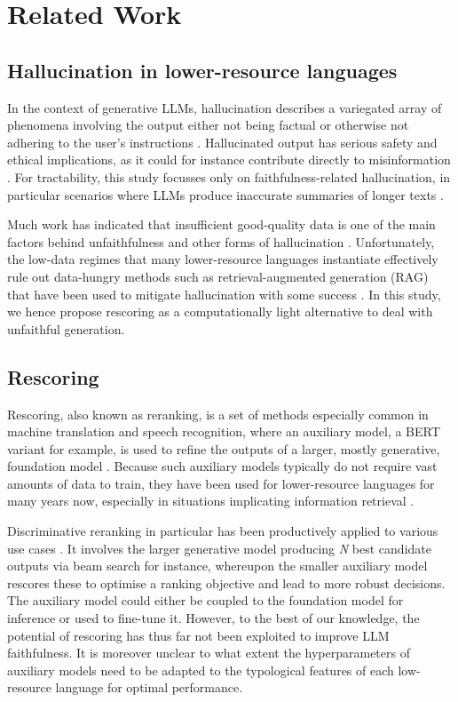 \section{Related Work}
\subsection{Hallucination in lower-resource languages}
In the context of generative LLMs, hallucination describes a variegated array of phenomena involving the output either not being factual or otherwise not adhering to the user's instructions \citep{huang2023survey}. Hallucinated output has serious safety and ethical implications, as it could for instance contribute directly to misinformation \citep{huang2023survey}. For tractability, this study focusses only on faithfulness-related hallucination, in particular scenarios where LLMs produce inaccurate summaries of longer texts \citep[cf.][]{qiu2023detecting}.

Much work has indicated that insufficient good-quality data is one of the main factors behind unfaithfulness and other forms of hallucination \citep{huang2023survey}. Unfortunately, the low-data regimes that many lower-resource languages instantiate effectively rule out data-hungry methods such as retrieval-augmented generation (RAG) that have been used to mitigate hallucination with some success \citep[cf.][]{kirchenbauer2024hallucination, tonmoy2024comprehensive}. In this study, we hence propose rescoring as a computationally light alternative to deal with unfaithful generation.

\subsection{Rescoring}
\label{sec:rescoring}
Rescoring, also known as reranking, is a set of methods especially common in machine translation and speech recognition, where an auxiliary model, a BERT variant for example, is used to refine the outputs of a larger, mostly generative, foundation model \citep{khedar2024automatic}. Because such auxiliary models typically do not require vast amounts of data to train, they have been used for lower-resource languages for many years now, especially in situations implicating information retrieval \citep[e.g.][]{lee2014graph, litschko2022parameter}. 

Discriminative reranking in particular has been productively applied to various use cases \citep{shen2004discriminative, mizumoto2016discriminative}. It involves the larger generative model producing \textit{N} best candidate outputs via beam search for instance, whereupon the smaller auxiliary model rescores these to optimise a ranking objective and lead to more robust decisions. The auxiliary model could either be coupled to the foundation model for inference or used to fine-tune it. However, to the best of our knowledge, the potential of rescoring has thus far not been exploited to improve LLM faithfulness. It is moreover unclear to what extent the hyperparameters of auxiliary models need to be adapted to the typological features of each low-resource language for optimal performance.

